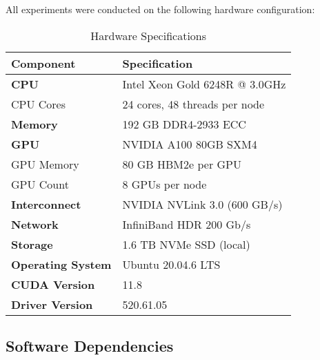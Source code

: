 \documentclass[review]{elsarticle}
\begin{document}
All experiments were conducted on the following hardware configuration:

\begin{table}[H]
\centering
\caption{Hardware Specifications}
\small
\begin{tabular}{ll}
\toprule
\textbf{Component} & \textbf{Specification} \\
\midrule
\textbf{CPU} & Intel Xeon Gold 6248R @ 3.0GHz \\
CPU Cores & 24 cores, 48 threads per node \\
\textbf{Memory} & 192 GB DDR4-2933 ECC \\
\textbf{GPU} & NVIDIA A100 80GB SXM4 \\
GPU Memory & 80 GB HBM2e per GPU \\
GPU Count & 8 GPUs per node \\
\textbf{Interconnect} & NVIDIA NVLink 3.0 (600 GB/s) \\
\textbf{Network} & InfiniBand HDR 200 Gb/s \\
\textbf{Storage} & 1.6 TB NVMe SSD (local) \\
\textbf{Operating System} & Ubuntu 20.04.6 LTS \\
\textbf{CUDA Version} & 11.8 \\
\textbf{Driver Version} & 520.61.05 \\
\bottomrule
\end{tabular}
\end{table}

\subsection{Software Dependencies}
\end{document}
